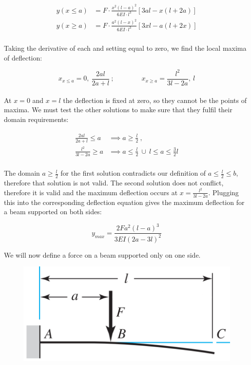\documentclass[a4paper]{article}
\begin{document}
	\begin{gather}
	\begin{aligned}
		y\left( x \leq a \right) &= F \cdot \frac{x^2 \left( l - a \right)^2}{6 EI \cdot l^3} \left[ 3a l - x \left( l + 2a \right) \right] \\
		y\left( x \geq a \right) &= F \cdot \frac{a^2 \left( l - x \right)^2}{6 EI \cdot l^3} \left[ 3x l - a \left( l + 2x \right) \right]
	\end{aligned}
	\end{gather}
	\\
	Taking the derivative of each and setting equal to zero, we find the local maxima of deflection:
	
	\begin{equation}
		x_{x \leq a} = 0,\ \frac{2al}{2a+l}\ ; \qquad\qquad
		x_{x \geq a} = \frac{l^2}{3l-2a},\ l
	\end{equation}
	\\
	At $ x = 0 $ and $ x = l $ the deflection is fixed at zero, so they cannot be the points of maxima. We must test the other solutions to make sure that they fulfil their domain requirements:
	
	\begin{gather}
	\begin{aligned}
		\frac{2al}{2a+l} \leq a &\implies a \geq \frac{l}{2}\ , \\
		\frac{l^2}{3l-2a} \geq a &\implies a \leq \frac{l}{2}\ \cup\ l \leq a \leq \frac{3}{2} l
	\end{aligned}
	\end{gather}
	\\
	The domain $ a \geq \frac{l}{2} $ for the first solution contradicts our definition of $ a \leq \frac{l}{2} \leq b $, therefore that solution is not valid. The second solution does not conflict, therefore it is valid and the maximum deflection occurs at $ x = \frac{l^2}{3l-2a} $. Plugging this into the corresponding deflection equation gives the maximum deflection for a beam supported on both sides:
	
	\begin{equation}
		y_{max} = \frac{2F a^2 \left( l - a \right)^3}{3 EI \left( 2a-3l \right)^2}
	\end{equation}
	
	\newpage
	We will now define a force on a beam supported only on one side. 
	
	\begin{figure}[H]
		\centering
		\includegraphics[width=0.7\linewidth]{../img/docs_beambend_cantilever}
	\end{figure}
\end{document}

